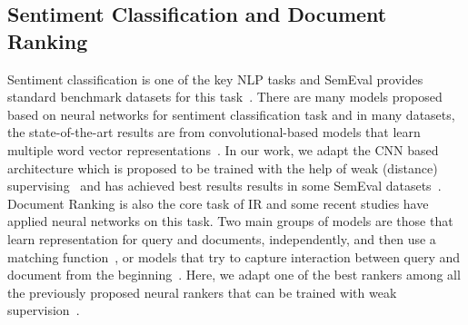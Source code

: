 \subsection{Sentiment Classification and Document Ranking}
Sentiment classification is one of the key NLP tasks and SemEval provides standard benchmark datasets for this task~\citep{rosenthal:2015,Nakov:2016,rosenthal2017semeval}. There are many models proposed based on neural networks for sentiment classification task and in many datasets, the state-of-the-art results are from convolutional-based models that learn multiple word vector representations~\citep{Kim:2014}. In our work, we adapt the CNN based architecture which is proposed to be trained with the help of weak (distance) supervising~\citep{Severyn:2015:SIGIR,Severyn:2015:SemEval,Deriu2016:SemEval} and has achieved best results results in some SemEval datasets~\citep{Deriu:2017}.
%
Document Ranking is also the core task of IR and some recent studies have applied neural networks on this task. Two main groups of models are those that learn representation for query and documents, independently,  and then use a matching function~\citep{Huang:2013,Mitra:2017,Shen:2014}, or models that try to capture interaction between query and document from the beginning~\citep{Lu:2013,Guo:2016,Dehghani:2017:SIGIR,Xiong:2017}. Here, we adapt one of the best rankers among all the previously proposed neural rankers that can be trained with weak supervision~\citep{Dehghani:2017:SIGIR,dehghani:2018:ICLR,neuralhype}.

